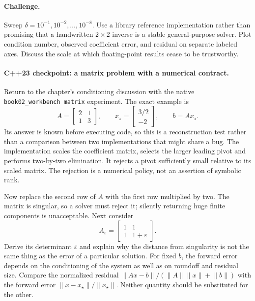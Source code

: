 \paragraph{Challenge.}
Sweep \(\delta=10^{-1},10^{-2},\ldots,10^{-8}\).
Use a library reference implementation rather than promising that a
handwritten \(2\times2\) inverse is a stable general-purpose solver.
Plot condition number, observed coefficient error, and residual
on separate labeled axes. Discuss the scale at which floating-point
results cease to be trustworthy.


\begin{booktwolab}
\paragraph{C++23 checkpoint: a matrix problem with a numerical contract.}
Return to the chapter's conditioning discussion with the native
\texttt{book02\_workbench matrix} experiment. The exact example is
\[
 A=\begin{bmatrix}2&1\\1&3\end{bmatrix},\qquad
 x_\star=\begin{bmatrix}3/2\\-2\end{bmatrix},\qquad b=Ax_\star.
\]
Its answer is known before executing code, so this is a reconstruction
test rather than a comparison between two implementations that might
share a bug. The implementation scales the coefficient matrix, selects
the larger leading pivot and performs two-by-two elimination. It
rejects a pivot sufficiently small relative to its scaled matrix.
The rejection is a numerical policy, not an assertion of symbolic rank.

Now replace the second row of \(A\) with the first row multiplied by
two. The matrix is singular, so a solver must reject it; silently
returning huge finite components is unacceptable. Next consider
\[
 A_\varepsilon=
 \begin{bmatrix}1&1\\1&1+\varepsilon\end{bmatrix}.
\]
Derive its determinant \(\varepsilon\) and explain why the distance from
singularity is not the same thing as the error of a particular solution.
For fixed \(b\), the forward error depends on the conditioning of the
system as well as on roundoff and residual size. Compare the normalized
residual \(\lVert Ax-b\rVert/(\lVert A\rVert\lVert x\rVert+\lVert b\rVert)\)
with the forward error \(\lVert x-x_\star\rVert/\lVert x_\star\rVert\).
Neither quantity should be substituted for the other.

\end{booktwolab}

